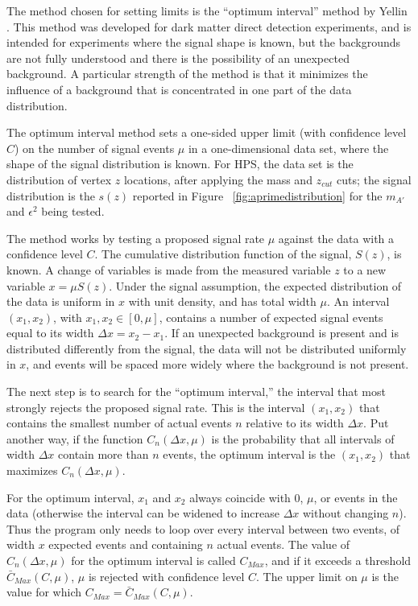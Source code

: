 \documentclass[twocolumn, showpacs, preprintnumbers,prd, superscriptaddress]{revtex4-1}
\begin{document}
The method chosen for setting limits is the ``optimum interval'' method by Yellin \cite{ref:yellin_finding_2002}.
This method was developed for dark matter direct detection experiments, and is intended for experiments where the signal shape is known, but the backgrounds are not fully understood and there is the possibility of an unexpected background. A particular strength of the method is that it minimizes the influence of a background that is concentrated in one part of the data distribution. 

The optimum interval method sets a one-sided upper limit (with confidence level $C$) on the number of signal events $\mu$ in a one-dimensional data set, where the shape of the signal distribution is known.
For HPS, the data set is the distribution of vertex $z$ locations, after applying the mass and $z_{cut}$ cuts; the signal distribution is the $s(z)$ reported in Figure ~\ref{fig:aprimedistribution} for the $m_{A'}$ and $\epsilon^2$ being tested.

The method works by testing a proposed signal rate $\mu$ against the data with a confidence level $C$.
The cumulative distribution function of the signal, $S(z)$, is known. A change of variables is made from the measured variable $z$ to a new variable $x=\mu S(z)$. Under the signal assumption, the expected distribution of the data is uniform in $x$ with unit density, and has total width $\mu$. An interval $(x_1,x_2)$, with $x_1, x_2 \in [0,\mu]$, contains a number of expected signal events equal to its width $\Delta x = x_2-x_1$. If an unexpected background is present and is distributed differently from the signal, the data will not be distributed uniformly in $x$, and events will be spaced more widely where the background is not present.

The next step is to search for the ``optimum interval,'' the interval that most strongly rejects the proposed signal rate. This is the interval $(x_1,x_2)$ that contains the smallest number of actual events $n$ relative to its width $\Delta x$. Put another way, if the function $C_n(\Delta x,\mu)$ is the probability that all intervals of width $\Delta x$ contain more than $n$ events, the optimum interval is the $(x_1,x_2)$ that maximizes $C_n(\Delta x,\mu)$.

For the optimum interval, $x_1$ and $x_2$ always coincide with 0, $\mu$, or events in the data (otherwise the interval can be widened to increase $\Delta x$ without changing $n$). Thus the program only needs to loop over every interval between two events, of width $x$ expected events and containing $n$ actual events. The value of $C_n(\Delta x,\mu)$ for the optimum interval is called $C_{Max}$, and if it exceeds a threshold $\bar{C}_{Max}(C,\mu)$, $\mu$ is rejected with confidence level $C$.
The upper limit on $\mu$ is the value for which $C_{Max}=\bar{C}_{Max}(C,\mu)$.
\end{document}

